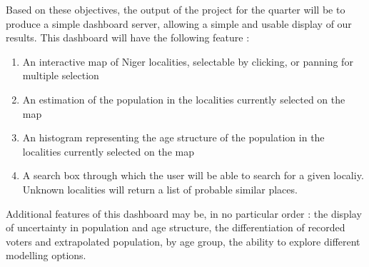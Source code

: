 Based on these objectives, the output of the project for the quarter will  be to produce a simple dashboard server, allowing a simple and usable display of our results. This dashboard will have the following feature :
\begin{enumerate}
	\item An interactive map of Niger localities, selectable by clicking, or panning for multiple selection
	\item An estimation of the population in the localities currently selected on the map
	\item An histogram representing the age structure of the population in the localities currently selected on the map
	\item A search box through which the user will be able to search for a given localiy. Unknown localities will return a list of probable similar places.
\end{enumerate}

Additional features of this dashboard may be, in no particular order : the display of uncertainty in population and age structure, the differentiation of recorded voters and extrapolated population, by age group, the ability to explore different modelling options.
